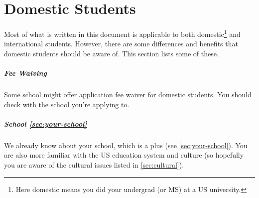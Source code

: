 \documentclass[oneside,11pt]{book}
\begin{document}


\chapter{Domestic Students}\label{sec:domestic-students}

Most of what is written in this document is applicable to both domestic\footnote{Here domestic means you did your undergrad (or MS) at a US university.} and international students.  However, there are some differences and benefits that domestic students should be aware of.  This section lists some of these.

\paragraph{Fee Waiving} Some school might offer application fee waiver for domestic students.  You should check with the school you're applying to. 

\paragraph{School \autoref{sec:your-school}} We already know about your school, which is a plus (see \autoref{sec:your-school}). You are also more familiar with the US education system and culture (so hopefully you are aware of the cultural issues listed in \autoref{sec:cultural}). 
\end{document}
